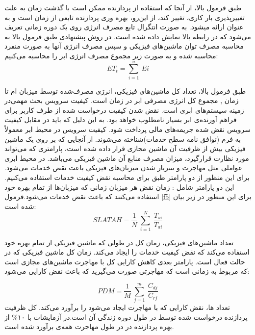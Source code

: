 طبق فرمول بالا، از آنجا  که استفاده از پردازنده ممکن است با گذشت زمان به علت تغییرپذیری بار کاری­، تغییر کند­، از این‌رو، بهره وری پردازنده تابعی از زمان است و به عنوان 
ارائه می­شود­.
 به صورت انتگرال تابع مصرف انرژی روی یک دوره زمانی تعریف می‌شود که در رابطه بالا نمایش داده شده است. در روش پیشنهادی طبق فرمول بالا به محاسبه مصرف توان ماشین‌های فیزیکی و سپس مصرف انرژی آنها به صورت منفرد محاسبه شده و به صورت زیر مجموع مصرف انرژی ابر را محاسبه می‌کنیم:
\cite{num15}
\begin{equation}
ET_t = \sum_{i=1}^{n}\:Ei
\label{f4}
\end{equation}

طبق فرمول بالا،
 تعداد کل ماشین‌های فیزیکی­،
  انرژی مصرف‌شده توسط میزبان 
   ام تا زمان
   ,
  مجموع کل انرژی مصرفی ابر در زمان
   است­.
   کیفیت سرویس بحث مهمی‌در زمینه سیستم‌های ابری است. نقض شدن کیفیت درخواست شده از طرف کاربر برای فراهم آورنده‌ی ابر بسیار نامطلوب خواهد بود. به این دلیل که باید در مقابل کیفیت سرویس نقض شده جریمه‌های مالی پرداخت شود. کیفیت سرویس در محیط ابر معمولاً به فرم
   (توافق نامه سطح خدمات)شناخته می‌شوند. از آنجایی که بر روی یک ماشین فیزیکی بیش از ظرفیت آن ماشین مجازی قرار داده‌ شده ‌است، پارامتری که می‌تواند مورد نظارت قرار‌گیرد، میزان مصرف منابع آن ماشین فیزیکی می‌باشد. 
   در محیط ابری عواملی مثل مهاجرت و سربار شدن میزبان‌های فیزیکی باعث نقض خدمات می‌شود. برای این منظور از دو پارامتر طبق
\cite{num15, num16}
   برای محاسبه نقض کیفیت خدمات استفاده می‌کنیم. این دو پارامتر شامل :
   زمان نقض
   هر میزبان
   زمانی که میزبان‌ها از تمام بهره خود استفاده می‌کنند که باعث نقض خدمات می‌شود.فرمول
\ref{f5}
    برای این منظور در زیر بیان شده است:
\cite{num16}
\begin{equation}
SLATAH=\frac{1}{N}\:\sum_{i=1}^{N}\:\frac{T_{si}}{T_{ai}}
\label{f5}
\end{equation}
   
   تعداد ماشین‌های فیزیکی،
      زمان کل در طولی که ماشین فیزیکی 
    از تمام بهره خود استفاده می‌کند که نقض کیفیت خدمات را ایجاد می‌کند. 
      زمان کل ماشین فیزیکی 
    که در حالت فعال است. 
   پارامتر بعدی کاهش کارایی کل با مهاجرت ماشین‌های مجازی
   است که مربوط به زمانی است که مهاجرتی صورت می‌گیرید که باعث نقض کارایی می‌شود: 
\cite{num16}

\begin{equation}
PDM = \frac{1}{M}\:\sum_{j=1}^{m}\:\frac{C_{dj}}{C_{rj}}
\label{f6}
\end{equation}
   تعداد
  ‌ها، 
    نقض کارایی 
    که با مهاجرت ایجاد می‌شود را برآورد می‌کند.
    کل ظرفیت پردازنده درخواست شده 
    توسط
          در طول دوره زندگی آن است.در آزمایشات 
      با 
      ۱۰\%
        از بهره پردازنده در
     در طول مهاجرت همه‌ی
     برآورد شده است.
     
